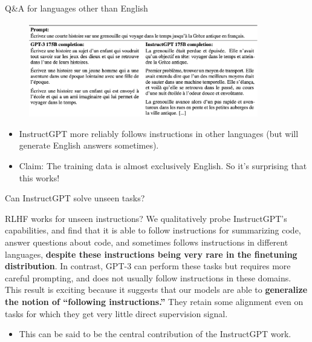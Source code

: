 \begin{vbframe}{Q\&A for languages other than English}

\vfill

\begin{figure}
\centering
\includegraphics[width = 10cm]{figure/nonenglish.png}
\end{figure}

\begin{itemize}
	\item InstructGPT more reliably follows instructions
	in other languages (but will generate English
	answers sometimes).
        \item Claim: The training data is almost exclusively
	English. So it's surprising that this works!
\end{itemize}

\vfill

\end{vbframe}

\begin{vbframe}{Can InstructGPT solve unseen tasks?}



\begin{block}{RLHF works for unseen instructions?}
We qualitatively probe InstructGPT’s capabilities, and find
that it is able to follow instructions for summarizing code,
answer questions about code, and sometimes follows
instructions in different languages, \textbf{despite these
instructions being very rare in the finetuning
distribution}. In contrast, GPT-3 can perform these tasks but
requires more careful prompting, and does not usually follow
instructions in these domains. This result is exciting
because it suggests that our models are able to \textbf{generalize
the notion of “following instructions.”} They retain some
alignment even on tasks for which they get very little
direct supervision signal.
\end{block}


\begin{itemize}
	\item This can be said to be the central contribution
	of the InstructGPT work.
\end{itemize}

\vfill


\end{vbframe}




